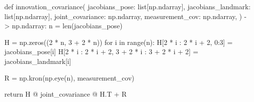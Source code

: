 \begin{pythoncode}
def innovation_covariance(
    jacobians_pose: list[np.ndarray],
    jacobians_landmark: list[np.ndarray],
    joint_covariance: np.ndarray,
    measurement_cov: np.ndarray,
) -> np.ndarray:
    n = len(jacobians_pose)

    H = np.zeros((2 * n, 3 + 2 * n))
    for i in range(n):
        H[2 * i : 2 * i + 2, 0:3] = jacobians_pose[i]
        H[2 * i : 2 * i + 2, 3 + 2 * i : 3 + 2 * i + 2] = jacobians_landmark[i]

    R = np.kron(np.eye(n), measurement_cov)

    return H @ joint_covariance @ H.T + R
\end{pythoncode}
